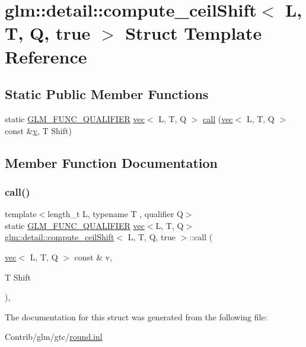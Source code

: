\hypertarget{structglm_1_1detail_1_1compute__ceil_shift_3_01_l_00_01_t_00_01_q_00_01true_01_4}{}\section{glm\+:\+:detail\+:\+:compute\+\_\+ceil\+Shift$<$ L, T, Q, true $>$ Struct Template Reference}
\label{structglm_1_1detail_1_1compute__ceil_shift_3_01_l_00_01_t_00_01_q_00_01true_01_4}
\subsection*{Static Public Member Functions}
\begin{DoxyCompactItemize}
\item 
static \mbox{\hyperlink{setup_8hpp_a33fdea6f91c5f834105f7415e2a64407}{G\+L\+M\+\_\+\+F\+U\+N\+C\+\_\+\+Q\+U\+A\+L\+I\+F\+I\+ER}} \mbox{\hyperlink{structglm_1_1vec}{vec}}$<$ L, T, Q $>$ \mbox{\hyperlink{structglm_1_1detail_1_1compute__ceil_shift_3_01_l_00_01_t_00_01_q_00_01true_01_4_a0e2262617f657d648f33fb98d6eca5c7}{call}} (\mbox{\hyperlink{structglm_1_1vec}{vec}}$<$ L, T, Q $>$ const \&\mbox{\hyperlink{_s_d_l__opengl_8h_a10a82eabcb59d2fcd74acee063775f90}{v}}, T Shift)
\end{DoxyCompactItemize}


\subsection{Member Function Documentation}
\mbox{\label{structglm_1_1detail_1_1compute__ceil_shift_3_01_l_00_01_t_00_01_q_00_01true_01_4_a0e2262617f657d648f33fb98d6eca5c7}} 
\subsubsection{\texorpdfstring{call()}{call()}}
{\footnotesize\ttfamily template$<$length\+\_\+t L, typename T , qualifier Q$>$ \\
static \mbox{\hyperlink{setup_8hpp_a33fdea6f91c5f834105f7415e2a64407}{G\+L\+M\+\_\+\+F\+U\+N\+C\+\_\+\+Q\+U\+A\+L\+I\+F\+I\+ER}} \mbox{\hyperlink{structglm_1_1vec}{vec}}$<$L, T, Q$>$ \mbox{\hyperlink{structglm_1_1detail_1_1compute__ceil_shift}{glm\+::detail\+::compute\+\_\+ceil\+Shift}}$<$ L, T, Q, true $>$\+::call (\begin{DoxyParamCaption}\item[{\mbox{\hyperlink{structglm_1_1vec}{vec}}$<$ L, T, Q $>$ const \&}]{v,  }\item[{T}]{Shift }\end{DoxyParamCaption})\hspace{0.3cm}{\ttfamily [inline]}, {\ttfamily [static]}}



The documentation for this struct was generated from the following file\+:\begin{DoxyCompactItemize}
\item 
Contrib/glm/gtc/\mbox{\hyperlink{round_8inl}{round.\+inl}}\end{DoxyCompactItemize}
